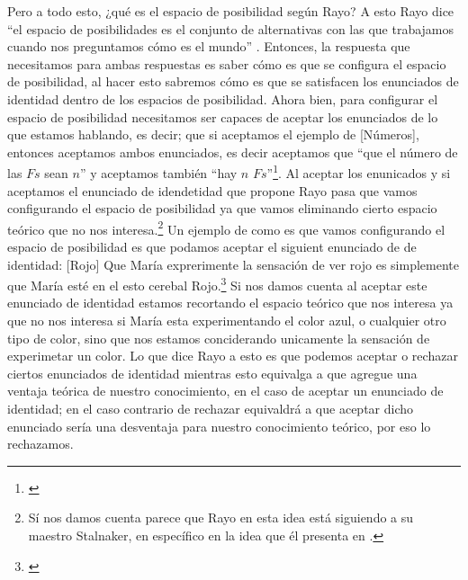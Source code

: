 \documentclass[]{article}
\begin{document}
Pero a todo esto, ¿qué es el espacio de posibilidad según Rayo?
A esto Rayo dice ``el espacio de posibilidades es el 
conjunto de alternativas con las que trabajamos cuando nos 
preguntamos cómo es el mundo'' \cite{rayo2013}. Entonces, 
la respuesta que necesitamos para ambas respuestas es 
saber c\'omo es que se configura el espacio de posibilidad, 
al hacer esto sabremos c\'omo es que se satisfacen los 
enunciados de identidad dentro de los espacios de posibilidad. 
Ahora bien, para configurar el espacio de posibilidad 
necesitamos ser capaces de aceptar los enunciados de lo que estamos
hablando, es decir; que si aceptamos el ejemplo de [Números], 
entonces aceptamos ambos enunciados, es decir aceptamos 
que  ``que el número de las $Fs$ sean $n$'' y aceptamos también 
``hay $n$ $Fs$''\footnote{\cite{rayo2013}}. Al aceptar 
los enunicados y si aceptamos el enunciado de idendetidad que propone 
Rayo pasa que vamos configurando el espacio de posibilidad 
ya que vamos eliminando cierto espacio teórico que no nos 
interesa.\footnote{
    S\'i nos damos cuenta parece que Rayo en esta idea 
    est\'a siguiendo a su maestro Stalnaker, en espec\'ifico en
    la idea que él presenta en \cite{stalnaker1978assertion}.
} Un ejemplo de como es que vamos configurando el espacio de 
posibilidad es que podamos aceptar el siguient enunciado de 
de identidad: [Rojo] Que María exprerimente la sensación
de ver rojo es simplemente que María esté en el esto 
cerebal Rojo.\footnote{\cite{rayo2013}} Si nos damos cuenta 
al aceptar este enunciado de identidad estamos recortando el 
espacio teórico que nos interesa ya que no nos interesa si 
María esta experimentando el color azul, o cualquier otro 
tipo de color, sino que nos estamos conciderando unicamente 
la sensación de experimetar un color. Lo que dice 
Rayo a esto es que podemos aceptar o rechazar ciertos enunciados 
de identidad mientras esto equivalga a que agregue una ventaja
teórica de nuestro conocimiento, en el caso de aceptar 
un enunciado de identidad; en el caso contrario de 
rechazar equivaldrá a que aceptar dicho enunciado 
sería una desventaja para nuestro conocimiento 
teórico, por eso lo rechazamos. 
\end{document}
